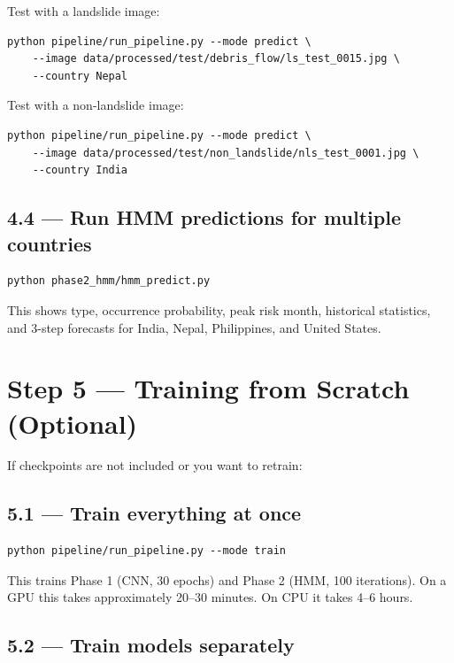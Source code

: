 \documentclass[11pt]{article}
\begin{document}
Test with a landslide image:
\begin{verbatim}
python pipeline/run_pipeline.py --mode predict \
    --image data/processed/test/debris_flow/ls_test_0015.jpg \
    --country Nepal
\end{verbatim}

Test with a non-landslide image:
\begin{verbatim}
python pipeline/run_pipeline.py --mode predict \
    --image data/processed/test/non_landslide/nls_test_0001.jpg \
    --country India
\end{verbatim}

\subsection{4.4 --- Run HMM predictions for multiple countries}

\begin{verbatim}
python phase2_hmm/hmm_predict.py
\end{verbatim}

This shows type, occurrence probability, peak risk month, historical statistics, and 3-step forecasts for India, Nepal, Philippines, and United States.

\section{Step 5 --- Training from Scratch (Optional)}

If checkpoints are not included or you want to retrain:

\subsection{5.1 --- Train everything at once}

\begin{verbatim}
python pipeline/run_pipeline.py --mode train
\end{verbatim}

This trains Phase 1 (CNN, 30 epochs) and Phase 2 (HMM, 100 iterations). On a GPU this takes approximately 20--30 minutes. On CPU it takes 4--6 hours.

\subsection{5.2 --- Train models separately}
\end{document}
